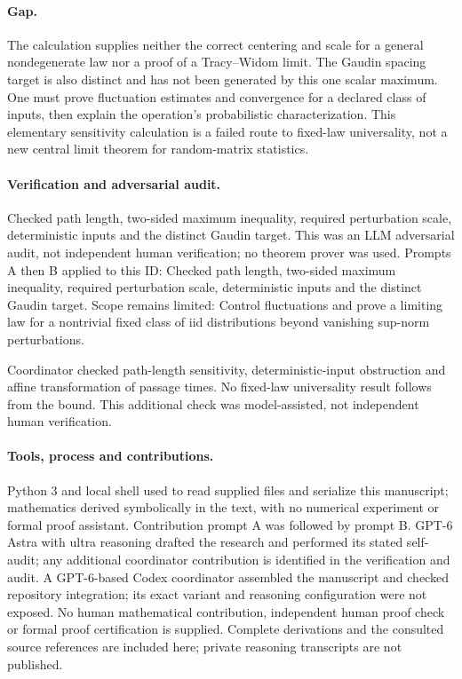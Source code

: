 \documentclass[11pt]{article}
\begin{document}
\paragraph{Gap.}The calculation supplies neither the correct centering and scale for a general nondegenerate law nor a proof of a Tracy--Widom limit. The Gaudin spacing target is also distinct and has not been generated by this one scalar maximum. One must prove fluctuation estimates and convergence for a declared class of inputs, then explain the operation's probabilistic characterization. This elementary sensitivity calculation is a failed route to fixed-law universality, not a new central limit theorem for random-matrix statistics.

\paragraph{Verification and adversarial audit.}
Checked path length, two-sided maximum inequality, required perturbation scale, deterministic inputs and the distinct Gaudin target. This was an LLM adversarial audit, not independent human verification; no theorem prover was used. Prompts A then B applied to this ID: Checked path length, two-sided maximum inequality, required perturbation scale, deterministic inputs and the distinct Gaudin target. Scope remains limited: Control fluctuations and prove a limiting law for a nontrivial fixed class of iid distributions beyond vanishing sup-norm perturbations.

Coordinator checked path-length sensitivity, deterministic-input obstruction and affine transformation of passage times. No fixed-law universality result follows from the bound. This additional check was model-assisted, not independent human verification.

\paragraph{Tools, process and contributions.}
Python 3 and local shell used to read supplied files and serialize this manuscript; mathematics derived symbolically in the text, with no numerical experiment or formal proof assistant. Contribution prompt A was followed by prompt B. GPT-6 Astra with ultra reasoning drafted the research and performed its stated self-audit; any additional coordinator contribution is identified in the verification and audit. A GPT-6-based Codex coordinator assembled the manuscript and checked repository integration; its exact variant and reasoning configuration were not exposed. No human mathematical contribution, independent human proof check or formal proof certification is supplied. Complete derivations and the consulted source references are included here; private reasoning transcripts are not published.
\end{document}
